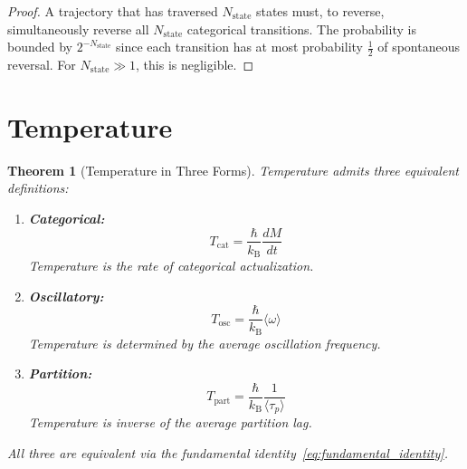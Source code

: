 \documentclass[twocolumn,10pt,a4paper]{article}
\theoremstyle{plain}
\newtheorem{theorem}{Theorem}[section]
\theoremstyle{definition}
\theoremstyle{remark}
\newcommand{\kB}{k_{\mathrm{B}}}
\newcommand{\taup}{\tau_p}
\begin{document}
\begin{proof}
A trajectory that has traversed $N_{\mathrm{state}}$ states must, to reverse, simultaneously reverse all $N_{\mathrm{state}}$ categorical transitions. The probability is bounded by $2^{-N_{\mathrm{state}}}$ since each transition has at most probability $\tfrac{1}{2}$ of spontaneous reversal. For $N_{\mathrm{state}} \gg 1$, this is negligible.
\end{proof}

\section{Temperature}
\label{sec:temperature}

\begin{theorem}[Temperature in Three Forms]
\label{thm:temperature}
Temperature admits three equivalent definitions:
\begin{enumerate}
    \item \textbf{Categorical:}
    \begin{equation}
        T_{\mathrm{cat}} = \frac{\hbar}{\kB}\frac{dM}{dt}
    \end{equation}
    Temperature is the rate of categorical actualization.

    \item \textbf{Oscillatory:}
    \begin{equation}
        T_{\mathrm{osc}} = \frac{\hbar}{\kB}\langle\omega\rangle
    \end{equation}
    Temperature is determined by the average oscillation frequency.

    \item \textbf{Partition:}
    \begin{equation}
        T_{\mathrm{part}} = \frac{\hbar}{\kB}\frac{1}{\langle\taup\rangle}
    \end{equation}
    Temperature is inverse of the average partition lag.
\end{enumerate}
All three are equivalent via the fundamental identity~\eqref{eq:fundamental_identity}.
\end{theorem}
\end{document}
